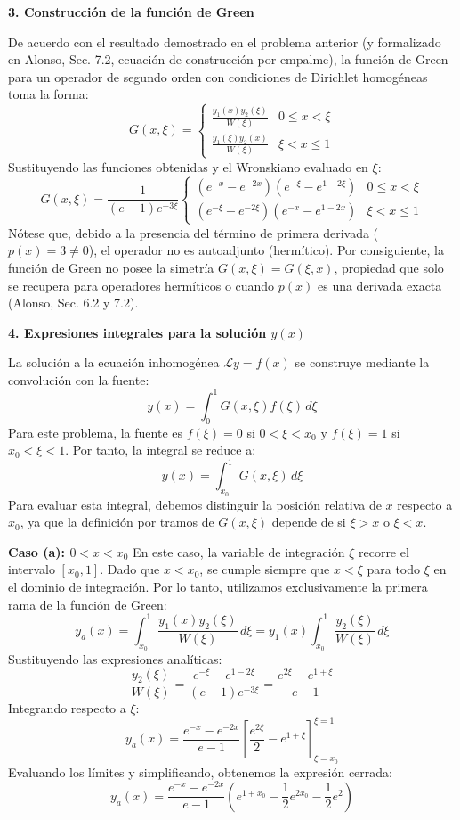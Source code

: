 \documentclass[a4paper]{article}
\begin{document}
\textbf{3. Construcción de la función de Green}

De acuerdo con el resultado demostrado en el problema anterior (y formalizado en Alonso, Sec. 7.2, ecuación de construcción por empalme), la función de Green para un operador de segundo orden con condiciones de Dirichlet homogéneas toma la forma:
$$ G(x, \xi) = \begin{cases} \displaystyle \frac{y_1(x) y_2(\xi)}{W(\xi)} & 0 \le x < \xi \\[12pt] \displaystyle \frac{y_1(\xi) y_2(x)}{W(\xi)} & \xi < x \le 1 \end{cases} $$
Sustituyendo las funciones obtenidas y el Wronskiano evaluado en $\xi$:
$$ G(x, \xi) = \frac{1}{(e-1)e^{-3\xi}} \begin{cases} (e^{-x} - e^{-2x})(e^{-\xi} - e^{1-2\xi}) & 0 \le x < \xi \\ (e^{-\xi} - e^{-2\xi})(e^{-x} - e^{1-2x}) & \xi < x \le 1 \end{cases} $$
Nótese que, debido a la presencia del término de primera derivada ($p(x)=3 \neq 0$), el operador no es autoadjunto (hermítico). Por consiguiente, la función de Green no posee la simetría $G(x, \xi) = G(\xi, x)$, propiedad que solo se recupera para operadores hermíticos o cuando $p(x)$ es una derivada exacta (Alonso, Sec. 6.2 y 7.2).

\textbf{4. Expresiones integrales para la solución $y(x)$}

La solución a la ecuación inhomogénea $\mathscr{L}y = f(x)$ se construye mediante la convolución con la fuente:
$$ y(x) = \int_0^1 G(x, \xi) f(\xi) \, d\xi $$
Para este problema, la fuente es $f(\xi) = 0$ si $0 < \xi < x_0$ y $f(\xi) = 1$ si $x_0 < \xi < 1$. Por tanto, la integral se reduce a:
$$ y(x) = \int_{x_0}^1 G(x, \xi) \, d\xi $$
Para evaluar esta integral, debemos distinguir la posición relativa de $x$ respecto a $x_0$, ya que la definición por tramos de $G(x, \xi)$ depende de si $\xi > x$ o $\xi < x$.

\textbf{Caso (a): $0 < x < x_0$}
En este caso, la variable de integración $\xi$ recorre el intervalo $[x_0, 1]$. Dado que $x < x_0$, se cumple siempre que $x < \xi$ para todo $\xi$ en el dominio de integración. Por lo tanto, utilizamos exclusivamente la primera rama de la función de Green:
$$ y_a(x) = \int_{x_0}^1 \frac{y_1(x) y_2(\xi)}{W(\xi)} \, d\xi = y_1(x) \int_{x_0}^1 \frac{y_2(\xi)}{W(\xi)} \, d\xi $$
Sustituyendo las expresiones analíticas:
$$ \frac{y_2(\xi)}{W(\xi)} = \frac{e^{-\xi} - e^{1-2\xi}}{(e-1)e^{-3\xi}} = \frac{e^{2\xi} - e^{1+\xi}}{e-1} $$
Integrando respecto a $\xi$:
$$ y_a(x) = \frac{e^{-x} - e^{-2x}}{e-1} \left[ \frac{e^{2\xi}}{2} - e^{1+\xi} \right]_{\xi=x_0}^{\xi=1} $$
Evaluando los límites y simplificando, obtenemos la expresión cerrada:
$$ y_a(x) = \frac{e^{-x} - e^{-2x}}{e-1} \left( e^{1+x_0} - \frac{1}{2}e^{2x_0} - \frac{1}{2}e^2 \right) $$
\end{document}
